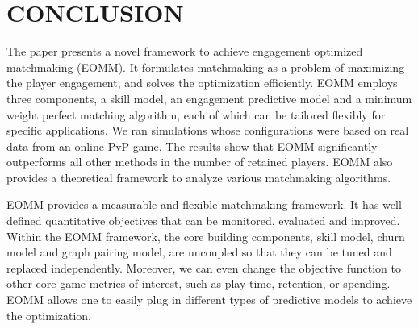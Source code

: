 \section{CONCLUSION}
The paper presents a novel framework to achieve engagement optimized matchmaking (EOMM). It formulates matchmaking as a problem of maximizing the player engagement, and solves the optimization efficiently. EOMM employs three components, a skill model, an engagement predictive model and a minimum weight perfect matching algorithm, each of which can be tailored flexibly for specific applications. We ran simulations whose configurations were based on real data from an online PvP game. The results show that EOMM significantly outperforms all other methods in the number of retained players. EOMM also provides a theoretical framework to analyze various matchmaking algorithms.

EOMM provides a measurable and flexible matchmaking framework. It has well-defined quantitative objectives that can be monitored, evaluated and improved. Within the EOMM framework, the core building components, skill model, churn model and graph pairing model, are uncoupled so that they can be tuned and replaced independently. Moreover, we can even change the objective function to other core game metrics of interest, such as play time, retention, or spending. EOMM allows one to easily plug in different types of predictive models to achieve the optimization.


